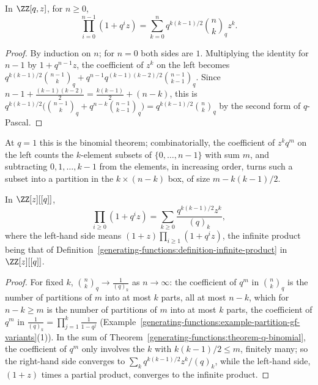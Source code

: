 \begin{theorem}\label{generating-functions:theorem-q-binomial}
In $\ZZ[q, z]$, for $n \geq 0$,
\[
\prod_{i=0}^{n-1}(1 + q^iz) = \sum_{k=0}^{n}q^{k(k-1)/2}\binom{n}{k}_qz^k.
\]
\end{theorem}

\begin{proof}
By induction on $n$; for $n = 0$ both sides are $1$. Multiplying the identity for $n - 1$ by $1 + q^{n-1}z$, the coefficient of $z^k$ on the left becomes
$q^{k(k-1)/2}\binom{n - 1}{k}_q + q^{n-1}q^{(k-1)(k-2)/2}\binom{n - 1}{k - 1}_q$. Since $n - 1 + \frac{(k-1)(k-2)}{2} = \frac{k(k-1)}{2} + (n - k)$, this is
$q^{k(k-1)/2}\bigl(\binom{n - 1}{k}_q + q^{n-k}\binom{n - 1}{k - 1}_q\bigr) = q^{k(k-1)/2}\binom{n}{k}_q$ by the second form of $q$-Pascal.
\end{proof}

At $q = 1$ this is the binomial theorem; combinatorially, the coefficient of $z^kq^m$ on the left counts the $k$-element subsets of $\{0, \ldots, n - 1\}$ with sum $m$, and subtracting
$0, 1, \ldots, k - 1$ from the elements, in increasing order, turns such a subset into a partition in the $k \times (n - k)$ box, of size $m - k(k-1)/2$.

\begin{corollary}\label{generating-functions:corollary-euler-identities}
In $\ZZ[z][[q]]$,
\[
\prod_{i \geq 0}(1 + q^iz) = \sum_{k \geq 0}\frac{q^{k(k-1)/2}z^k}{(q)_k},
\]
where the left-hand side means $(1 + z)\prod_{i \geq 1}(1 + q^iz)$, the infinite product being that of Definition~\ref{generating-functions:definition-infinite-product} in $\ZZ[z][[q]]$.
\end{corollary}

\begin{proof}
For fixed $k$, $\binom{n}{k}_q \to \frac{1}{(q)_k}$ as $n \to \infty$: the coefficient of $q^m$ in $\binom{n}{k}_q$ is the number of partitions of $m$ into at most $k$ parts, all at most $n - k$,
which for $n - k \geq m$ is the number of partitions of $m$ into at most $k$ parts, the coefficient of $q^m$ in $\frac{1}{(q)_k} = \prod_{j=1}^{k}\frac{1}{1 - q^j}$
(Example~\ref{generating-functions:example-partition-gf-variants}(1)). In the sum of Theorem~\ref{generating-functions:theorem-q-binomial}, the coefficient of $q^m$ only involves the $k$ with
$k(k-1)/2 \leq m$, finitely many; so the right-hand side converges to $\sum_kq^{k(k-1)/2}z^k/(q)_k$, while the left-hand side, $(1 + z)$ times a partial product, converges to the infinite product.
\end{proof}

